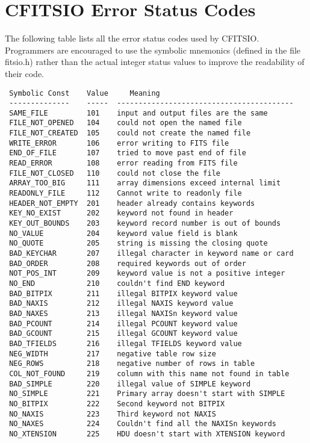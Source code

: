 \chapter{ CFITSIO Error Status Codes }

The following table lists all the error status codes used by CFITSIO.
Programmers are encouraged to use the symbolic  mnemonics (defined in
the file fitsio.h) rather than the actual integer status values to
improve the readability of their code.

\begin{verbatim}
 Symbolic Const    Value     Meaning
 --------------    -----  -----------------------------------------
 SAME_FILE         101    input and output files are the same
 FILE_NOT_OPENED   104    could not open the named file
 FILE_NOT_CREATED  105    could not create the named file
 WRITE_ERROR       106    error writing to FITS file
 END_OF_FILE       107    tried to move past end of file
 READ_ERROR        108    error reading from FITS file
 FILE_NOT_CLOSED   110    could not close the file
 ARRAY_TOO_BIG     111    array dimensions exceed internal limit
 READONLY_FILE     112    Cannot write to readonly file
 HEADER_NOT_EMPTY  201    header already contains keywords
 KEY_NO_EXIST      202    keyword not found in header
 KEY_OUT_BOUNDS    203    keyword record number is out of bounds
 NO_VALUE          204    keyword value field is blank
 NO_QUOTE          205    string is missing the closing quote
 BAD_KEYCHAR       207    illegal character in keyword name or card
 BAD_ORDER         208    required keywords out of order
 NOT_POS_INT       209    keyword value is not a positive integer
 NO_END            210    couldn't find END keyword
 BAD_BITPIX        211    illegal BITPIX keyword value
 BAD_NAXIS         212    illegal NAXIS keyword value
 BAD_NAXES         213    illegal NAXISn keyword value
 BAD_PCOUNT        214    illegal PCOUNT keyword value
 BAD_GCOUNT        215    illegal GCOUNT keyword value
 BAD_TFIELDS       216    illegal TFIELDS keyword value
 NEG_WIDTH         217    negative table row size
 NEG_ROWS          218    negative number of rows in table
 COL_NOT_FOUND     219    column with this name not found in table
 BAD_SIMPLE        220    illegal value of SIMPLE keyword
 NO_SIMPLE         221    Primary array doesn't start with SIMPLE
 NO_BITPIX         222    Second keyword not BITPIX
 NO_NAXIS          223    Third keyword not NAXIS
 NO_NAXES          224    Couldn't find all the NAXISn keywords
 NO_XTENSION       225    HDU doesn't start with XTENSION keyword

\end{verbatim}
